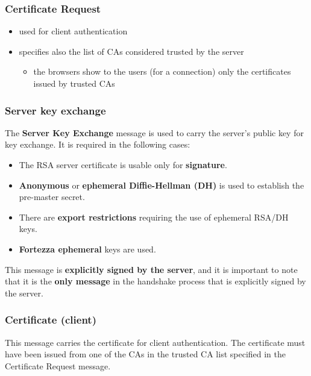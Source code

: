 \subsubsection{Certificate Request}

\begin{itemize}[itemsep=0pt]
    \item used for client authentication
    \item specifies also the list of CAs considered trusted by the
          server
          \begin{itemize}[itemsep=0pt]
              \item the browsers show to the users (for a connection) only the
                    certificates issued by trusted CAs
          \end{itemize}
\end{itemize}

\subsubsection{Server key exchange}
The \textbf{Server Key Exchange} message is used to carry the server's public key for key exchange. It is required in the following cases:

\begin{itemize}[itemsep=0pt]
    \item The RSA server certificate is usable only for \textbf{signature}.
    \item \textbf{Anonymous} or \textbf{ephemeral Diffie-Hellman (DH)}
          is used to establish the pre-master secret.
    \item There are \textbf{export restrictions} requiring the use of ephemeral RSA/DH keys.
    \item \textbf{Fortezza ephemeral} keys are used.
\end{itemize}

This message is \textbf{explicitly signed by the server}, and it is important to note that it is the \textbf{only message} in the handshake process that is explicitly signed by the server.

\subsubsection{Certificate (client)}
This message carries the certificate for client authentication. The certificate must have been issued from one of the CAs in the trusted CA list specified in the Certificate Request message.


